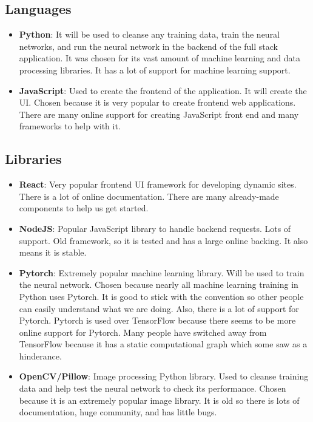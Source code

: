 \documentclass{article}
\begin{document}
\subsection{Languages}
\begin{itemize}
  \item \textbf{Python}: It will be used to cleanse any training data, train the neural networks,
    and run the neural network in the backend of the full stack application. It was chosen for its
    vast amount of machine learning and data processing libraries. It has a lot of support for
    machine learning support.
  \item \textbf{JavaScript}: Used to create the frontend of the application. It will create the UI.
    Chosen because it is very popular to create frontend web applications. There are many online 
    support for creating JavaScript front end and many frameworks to help with it.
\end{itemize}

\subsection{Libraries}
\begin{itemize}
  \item \textbf{React}: Very popular frontend UI framework for developing dynamic sites. There is
    a lot of online documentation. There are many already-made components to help us get started.
  \item \textbf{NodeJS}: Popular JavaScript library to handle backend requests. Lots of support. 
    Old framework, so it is tested and has a large online backing. It also means it is stable.
  \item \textbf{Pytorch}: Extremely popular machine learning library. Will be used to train the 
    neural network. Chosen because nearly all machine learning training in Python uses Pytorch. It
    is good to stick with the convention so other people can easily understand what we are doing. 
    Also, there is a lot of support for Pytorch. Pytorch is used over TensorFlow because there seems to be more online support for Pytorch. Many people have switched away from TensorFlow because it has a static computational graph which some saw as a hinderance.
  \item \textbf{OpenCV/Pillow}: Image processing Python library. Used to cleanse training data and help
    test the neural network to check its performance. Chosen because it is an extremely popular
    image library. It is old so there is lots of documentation, huge community, and has little 
    bugs.
\end{itemize}
\end{document}
